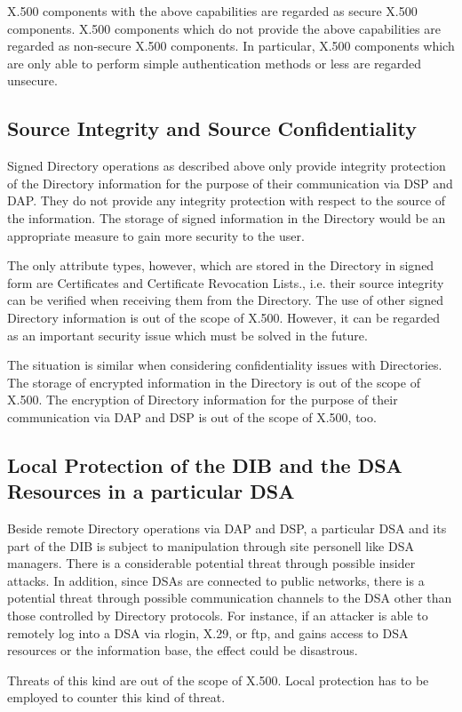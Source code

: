 X.500 components with the above capabilities are regarded as secure X.500 components.
X.500 components which do not provide the above capabilities are regarded as
non-secure X.500 components. In particular, X.500 components which are only able
to perform simple authentication methods or less are regarded unsecure.


\subsection{Source Integrity and Source Confidentiality}

Signed Directory operations as described above only provide integrity protection
of the Directory information for the purpose of their communication via
DSP and DAP. They do not provide any integrity protection with respect to
the source of the information. The storage of signed information in the 
Directory would be an appropriate measure to gain more security to the user.

The only attribute types, however, which are stored in the Directory in signed 
form are Certificates and Certificate Revocation Lists., i.e. their source
integrity can be verified when receiving them from the Directory. The use of
other signed Directory information is out of the scope of X.500. However, it can
be regarded as an important security issue which must be solved in the future.

The situation is similar when considering confidentiality issues with Directories.
The storage of encrypted information in the Directory is out of the scope of
X.500. The encryption of Directory information for the purpose of their
communication via DAP and DSP is out of the scope of X.500, too.

\subsection{Local Protection of the DIB and the DSA Resources in a particular DSA}

Beside remote Directory operations via DAP and DSP, a particular DSA
and its part of the DIB is subject to manipulation through site personell
like DSA managers. There is a considerable potential threat through
possible insider attacks. In addition, since DSAs are connected to
public networks, there is a potential threat through possible communication
channels to the DSA other than those controlled by Directory protocols.
For instance, if an attacker is able to remotely log into a DSA via rlogin,
X.29, or ftp, and gains access to DSA resources or the information base,
the effect could be disastrous.

Threats of this kind are out of the scope of X.500. Local protection has to
be employed to counter this kind of threat.
